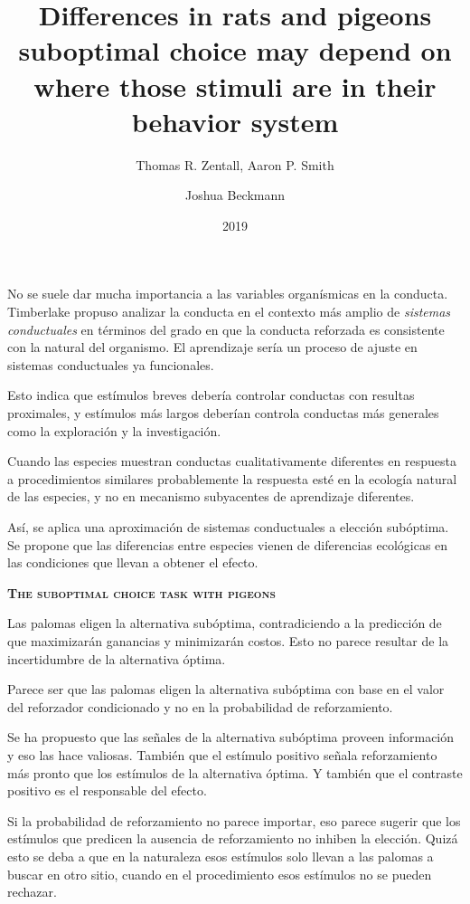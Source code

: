 \documentclass[a4paper,12pt]{article}
\title{Differences in rats and pigeons suboptimal choice may depend on where those stimuli are in their behavior system}
\author{Thomas R. Zentall, Aaron P. Smith \and Joshua Beckmann}
\date{2019}
\begin{document}
{\scshape\bfseries \maketitle}

No se suele dar mucha importancia a las variables organísmicas en la conducta. Timberlake propuso analizar la conducta en el contexto más amplio de {\itshape sistemas conductuales} en términos del grado en que la conducta reforzada es consistente con la natural del organismo. El aprendizaje sería un proceso de ajuste en sistemas conductuales ya funcionales.

Esto indica que estímulos breves debería controlar conductas con resultas proximales, y estímulos más largos deberían controla conductas más generales como la exploración y la investigación.

Cuando las especies muestran conductas cualitativamente diferentes en respuesta a procedimientos similares probablemente la respuesta esté en la ecología natural de las especies, y no en mecanismo subyacentes de aprendizaje diferentes.

Así, se aplica una aproximación de sistemas conductuales a elección subóptima. Se propone que las diferencias entre especies vienen de diferencias ecológicas en las condiciones que llevan a obtener el efecto.

{\scshape\bfseries The suboptimal choice task with pigeons}

Las palomas eligen la alternativa subóptima, contradiciendo a la predicción de que maximizarán ganancias y minimizarán costos. Esto  no parece resultar de la incertidumbre de la alternativa óptima.

Parece ser que las palomas eligen la alternativa subóptima con base en el valor del reforzador condicionado y no en la probabilidad de reforzamiento.

Se ha propuesto que las señales de la alternativa subóptima proveen información y eso las hace valiosas. También que el estímulo positivo señala reforzamiento más pronto que los estímulos de la alternativa óptima. Y también que el contraste positivo es el responsable del efecto.

Si la probabilidad de reforzamiento no parece importar, eso parece sugerir que los estímulos que predicen la ausencia de reforzamiento no inhiben la elección. Quizá esto se deba a que en la naturaleza esos estímulos solo llevan a las palomas a buscar en otro sitio, cuando en el procedimiento esos estímulos no se pueden rechazar.
\end{document}
